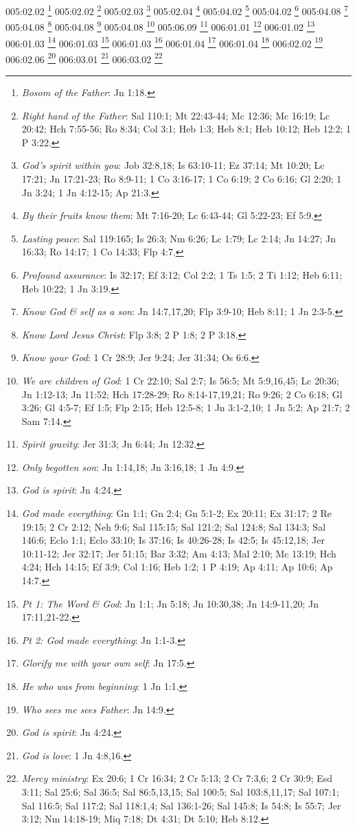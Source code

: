 {005:02.02 \footnote{\textit{Bosom of the Father}: Jn 1:18.}
005:02.02 \footnote{\textit{Right hand of the Father}: Sal 110:1; Mt 22:43-44; Mc 12:36; Mc 16:19; Lc 20:42; Hch 7:55-56; Ro 8:34; Col 3:1; Heb 1:3; Heb 8:1; Heb 10:12; Heb 12:2; 1 P 3:22.}
005:02.03 \footnote{\textit{God's spirit within you}: Job 32:8,18; Is 63:10-11; Ez 37:14; Mt 10:20; Lc 17:21; Jn 17:21-23; Ro 8:9-11; 1 Co 3:16-17; 1 Co 6:19; 2 Co 6:16; Gl 2:20; 1 Jn 3:24; 1 Jn 4:12-15; Ap 21:3.}
005:02.04 \footnote{\textit{By their fruits know them}: Mt 7:16-20; Lc 6:43-44; Gl 5:22-23; Ef 5:9.}
005:04.02 \footnote{\textit{Lasting peace}: Sal 119:165; Is 26:3; Nm 6:26; Lc 1:79; Lc 2:14; Jn 14:27; Jn 16:33; Ro 14:17; 1 Co 14:33; Flp 4:7.}
005:04.02 \footnote{\textit{Profound assurance}: Is 32:17; Ef 3:12; Col 2:2; 1 Ts 1:5; 2 Ti 1:12; Heb 6:11; Heb 10:22; 1 Jn 3:19.}
005:04.08 \footnote{\textit{Know God & self as a son}: Jn 14:7,17,20; Flp 3:9-10; Heb 8:11; 1 Jn 2:3-5.}
005:04.08 \footnote{\textit{Know Lord Jesus Christ}: Flp 3:8; 2 P 1:8; 2 P 3:18.}
005:04.08 \footnote{\textit{Know your God}: 1 Cr 28:9; Jer 9:24; Jer 31:34; Os 6:6.}
005:04.08 \footnote{\textit{We are children of God}: 1 Cr 22:10; Sal 2:7; Is 56:5; Mt 5:9,16,45; Lc 20:36; Jn 1:12-13; Jn 11:52; Hch 17:28-29; Ro 8:14-17,19,21; Ro 9:26; 2 Co 6:18; Gl 3:26; Gl 4:5-7; Ef 1:5; Flp 2:15; Heb 12:5-8; 1 Jn 3:1-2,10; 1 Jn 5:2; Ap 21:7; 2 Sam 7:14.}
005:06.09 \footnote{\textit{Spirit gravity}: Jer 31:3; Jn 6:44; Jn 12:32.}
006:01.01 \footnote{\textit{Only begotten son}: Jn 1:14,18; Jn 3:16,18; 1 Jn 4:9.}
006:01.02 \footnote{\textit{God is spirit}: Jn 4:24.}
006:01.03 \footnote{\textit{God made everything}: Gn 1:1; Gn 2:4; Gn 5:1-2; Ex 20:11; Ex 31:17; 2 Re 19:15; 2 Cr 2:12; Neh 9:6; Sal 115:15; Sal 121:2; Sal 124:8; Sal 134:3; Sal 146:6; Eclo 1:1; Eclo 33:10; Is 37:16; Is 40:26-28; Is 42:5; Is 45:12,18; Jer 10:11-12; Jer 32:17; Jer 51:15; Bar 3:32; Am 4:13; Mal 2:10; Mc 13:19; Hch 4:24; Hch 14:15; Ef 3:9; Col 1:16; Heb 1:2; 1 P 4:19; Ap 4:11; Ap 10:6; Ap 14:7.}
006:01.03 \footnote{\textit{Pt 1: The Word & God}: Jn 1:1; Jn 5:18; Jn 10:30,38; Jn 14:9-11,20; Jn 17:11,21-22.}
006:01.03 \footnote{\textit{Pt 2: God made everything}: Jn 1:1-3.}
006:01.04 \footnote{\textit{Glorify me with your own self}: Jn 17:5.}
006:01.04 \footnote{\textit{He who was from beginning}: 1 Jn 1:1.}
006:02.02 \footnote{\textit{Who sees me sees Father}: Jn 14:9.}
006:02.06 \footnote{\textit{God is spirit}: Jn 4:24.}
006:03.01 \footnote{\textit{God is love}: 1 Jn 4:8,16.}
006:03.02 \footnote{\textit{Mercy ministry}: Ex 20:6; 1 Cr 16:34; 2 Cr 5:13; 2 Cr 7:3,6; 2 Cr 30:9; Esd 3:11; Sal 25:6; Sal 36:5; Sal 86:5,13,15; Sal 100:5; Sal 103:8,11,17; Sal 107:1; Sal 116:5; Sal 117:2; Sal 118:1,4; Sal 136:1-26; Sal 145:8; Is 54:8; Is 55:7; Jer 3:12; Nm 14:18-19; Miq 7:18; Dt 4:31; Dt 5:10; Heb 8:12.}
}
